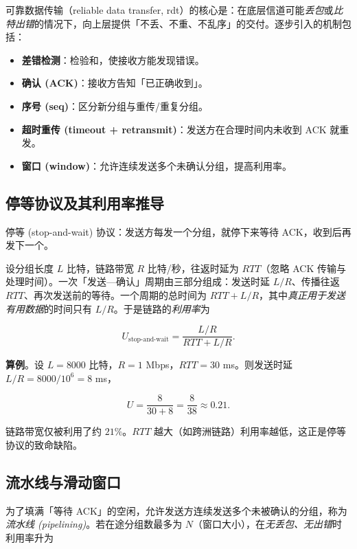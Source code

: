 可靠数据传输（reliable data transfer, rdt）的核心是：在底层信道可能\emph{丢包}或\emph{比特出错}的情况下，向上层提供「不丢、不重、不乱序」的交付。逐步引入的机制包括：

\begin{itemize}
    \item \textbf{差错检测}：检验和，使接收方能发现错误。
    \item \textbf{确认 (ACK)}：接收方告知「已正确收到」。
    \item \textbf{序号 (seq)}：区分新分组与重传/重复分组。
    \item \textbf{超时重传 (timeout + retransmit)}：发送方在合理时间内未收到 ACK 就重发。
    \item \textbf{窗口 (window)}：允许连续发送多个未确认分组，提高利用率。
\end{itemize}

\subsection{停等协议及其利用率推导}

停等 (stop-and-wait) 协议：发送方每发一个分组，就停下来等待 ACK，收到后再发下一个。

设分组长度 $L$ 比特，链路带宽 $R$ 比特/秒，往返时延为 $RTT$（忽略 ACK 传输与处理时间）。一次「发送---确认」周期由三部分组成：发送时延 $L/R$、传播往返 $RTT$、再次发送前的等待。一个周期的总时间为 $RTT + L/R$，其中\emph{真正用于发送有用数据}的时间只有 $L/R$。于是链路的\emph{利用率}为

\begin{equation}
    U_{\text{stop-and-wait}} = \frac{L/R}{RTT + L/R}.
    \label{eq:stopwait}
\end{equation}

\textbf{算例}。设 $L = 8000$ 比特，$R = 1$ Mbps，$RTT = 30$ ms。则发送时延 $L/R = 8000/10^6 = 8$ ms，

\[
U = \frac{8}{30 + 8} = \frac{8}{38} \approx 0.21.
\]

链路带宽仅被利用了约 $21\%$。$RTT$ 越大（如跨洲链路）利用率越低，这正是停等协议的致命缺陷。

\subsection{流水线与滑动窗口}

为了填满「等待 ACK」的空闲，允许发送方连续发送多个未被确认的分组，称为\emph{流水线 (pipelining)}。若在途分组数最多为 $N$（窗口大小），在\emph{无丢包、无出错}时利用率升为

